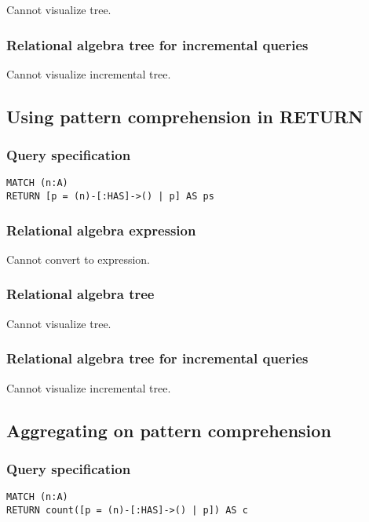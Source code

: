 Cannot visualize tree.

\subsubsection*{Relational algebra tree for incremental queries}

Cannot visualize incremental tree.

\subsection{Using pattern comprehension in RETURN}

\subsubsection*{Query specification}

\begin{lstlisting}
MATCH (n:A)
RETURN [p = (n)-[:HAS]->() | p] AS ps
\end{lstlisting}

\subsubsection*{Relational algebra expression}

Cannot convert to expression.

\subsubsection*{Relational algebra tree}

Cannot visualize tree.

\subsubsection*{Relational algebra tree for incremental queries}

Cannot visualize incremental tree.

\subsection{Aggregating on pattern comprehension}

\subsubsection*{Query specification}

\begin{lstlisting}
MATCH (n:A)
RETURN count([p = (n)-[:HAS]->() | p]) AS c
\end{lstlisting}

